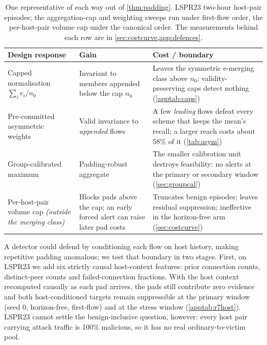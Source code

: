 \documentclass[conference]{IEEEtran}
\begin{document}
\begin{table}[t]
\centering
\caption{One representative of each way out of \cref{thm:padding}. LSPR23 two-hour host-pair episodes;
the aggregation-cap and weighting sweeps run under first-flow order, the per-host-pair volume cap
under the canonical order. The measurements behind each row are in \cref{sec:costcurve,app:defences}.}
\label{tab:defenses}
\footnotesize
\setlength{\tabcolsep}{6pt}
\begin{tabular}{@{}>{\raggedright\arraybackslash}p{4.0cm}>{\raggedright\arraybackslash}p{5.4cm}>{\raggedright\arraybackslash}p{7.2cm}@{}}
\toprule
Design response & Gain & Cost / boundary \\
\midrule
Capped normalisation $\sum_ie_i/n_0$ & Invariant to members appended below the cap $n_0$ &
Leaves the symmetric e-merging class above $n_0$; validity-preserving caps detect nothing
(\cref{apptab:caps}) \\[2pt]
Pre-committed asymmetric weights~\cite{wang2025admissible} & Valid invariance to \emph{appended} flows &
A few \emph{leading} flows defeat every scheme that keeps the mean's recall; a larger reach costs about
$58\%$ of it (\cref{tab:asym}) \\[2pt]
Group-calibrated maximum & Padding-robust aggregate & The smaller calibration unit destroys
feasibility: no alerts at the primary or secondary window (\cref{sec:groupcal}) \\[2pt]
Per-host-pair volume cap \emph{(outside the merging class)} & Blocks pads above the cap; an early
forced alert can raise later pad costs & Truncates benign episodes; leaves residual suppression;
ineffective in the horizon-free arm (\cref{sec:costcurve}) \\
\bottomrule
\end{tabular}
\end{table}

A detector could defend by conditioning each flow on host history, making repetitive padding anomalous; we test that boundary in two stages. First, on LSPR23 we add six strictly causal host-context features:
prior connection counts, distinct-peer counts and failed-connection fractions. With the host
context recomputed causally as each pad arrives, the pads still contribute zero evidence and both
host-conditioned targets remain suppressible at the primary window (seed 0, horizon-free, first-flow)
and at the stress window (\cref{apptab:r7host}). LSPR23 cannot settle the
benign-inclusive question, however: every host pair carrying attack traffic is 100\% malicious, so it
has no real ordinary-to-victim pool.
\end{document}
